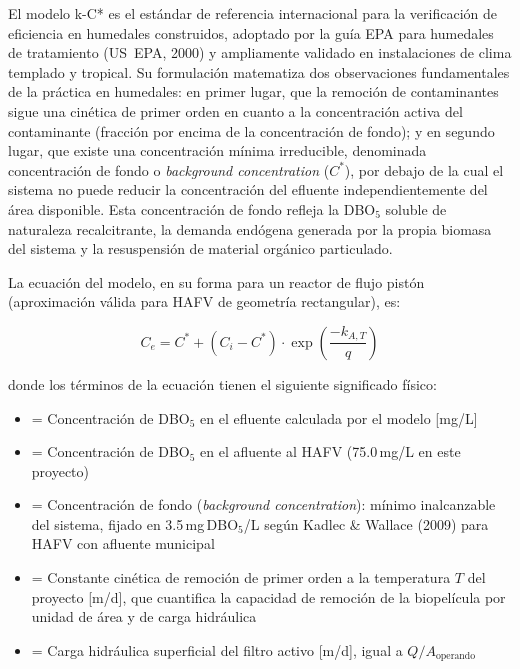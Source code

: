 El modelo k-C* es el estándar de referencia internacional para la verificación de eficiencia en humedales construidos, adoptado por la guía EPA para humedales de tratamiento (US~EPA, 2000) y ampliamente validado en instalaciones de clima templado y tropical. Su formulación matematiza dos observaciones fundamentales de la práctica en humedales: en primer lugar, que la remoción de contaminantes sigue una cinética de primer orden en cuanto a la concentración activa del contaminante (fracción por encima de la concentración de fondo); y en segundo lugar, que existe una concentración mínima irreducible, denominada concentración de fondo o \textit{background concentration} ($C^*$), por debajo de la cual el sistema no puede reducir la concentración del efluente independientemente del área disponible. Esta concentración de fondo refleja la DBO$_5$ soluble de naturaleza recalcitrante, la demanda endógena generada por la propia biomasa del sistema y la resuspensión de material orgánico particulado.

La ecuación del modelo, en su forma para un reactor de flujo pistón (aproximación válida para HAFV de geometría rectangular), es:

\begin{equation}
C_e = C^* + (C_i - C^*) \cdot \exp\!\left(\frac{-k_{A,T}}{q}\right)
\label{eq:kC_star}
\end{equation}

donde los términos de la ecuación tienen el siguiente significado físico:

\begin{itemize}[noitemsep,leftmargin=2em]
    \item[$C_e$] = Concentración de DBO$_5$ en el efluente calculada por el modelo [mg/L]
    \item[$C_i$] = Concentración de DBO$_5$ en el afluente al HAFV (75.0\,mg/L en este proyecto)
    \item[$C^*$] = Concentración de fondo (\textit{background concentration}): mínimo inalcanzable del sistema, fijado en 3.5\,mg\,DBO$_5$/L según Kadlec \& Wallace (2009) para HAFV con afluente municipal
    \item[$k_{A,T}$] = Constante cinética de remoción de primer orden a la temperatura $T$ del proyecto [m/d], que cuantifica la capacidad de remoción de la biopelícula por unidad de área y de carga hidráulica
    \item[$q$] = Carga hidráulica superficial del filtro activo [m/d], igual a $Q / A_\text{operando}$
\end{itemize}

